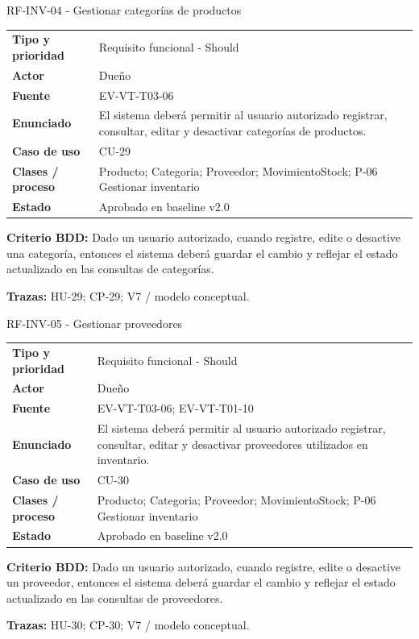 \begin{reqbox}{RF-INV-04 - Gestionar categorías de productos}
\begin{tabularx}{\textwidth}{>{\bfseries}p{3.2cm}Y}
Tipo y prioridad & Requisito funcional - Should \\
Actor & Dueño \\
Fuente & EV-VT-T03-06 \\
Enunciado & El sistema deberá permitir al usuario autorizado registrar, consultar, editar y desactivar categorías de productos. \\
Caso de uso & CU-29 \\
Clases / proceso & Producto; Categoria; Proveedor; MovimientoStock; P-06 Gestionar inventario \\
Estado & Aprobado en baseline v2.0 \\
\end{tabularx}
\textbf{Criterio BDD:} Dado un usuario autorizado, cuando registre, edite o desactive una categoría, entonces el sistema deberá guardar el cambio y reflejar el estado actualizado en las consultas de categorías.

\textbf{Trazas:} HU-29; CP-29; V7 / modelo conceptual.
\end{reqbox}


\begin{reqbox}{RF-INV-05 - Gestionar proveedores}
\begin{tabularx}{\textwidth}{>{\bfseries}p{3.2cm}Y}
Tipo y prioridad & Requisito funcional - Should \\
Actor & Dueño \\
Fuente & EV-VT-T03-06; EV-VT-T01-10 \\
Enunciado & El sistema deberá permitir al usuario autorizado registrar, consultar, editar y desactivar proveedores utilizados en inventario. \\
Caso de uso & CU-30 \\
Clases / proceso & Producto; Categoria; Proveedor; MovimientoStock; P-06 Gestionar inventario \\
Estado & Aprobado en baseline v2.0 \\
\end{tabularx}
\textbf{Criterio BDD:} Dado un usuario autorizado, cuando registre, edite o desactive un proveedor, entonces el sistema deberá guardar el cambio y reflejar el estado actualizado en las consultas de proveedores.

\textbf{Trazas:} HU-30; CP-30; V7 / modelo conceptual.
\end{reqbox}


